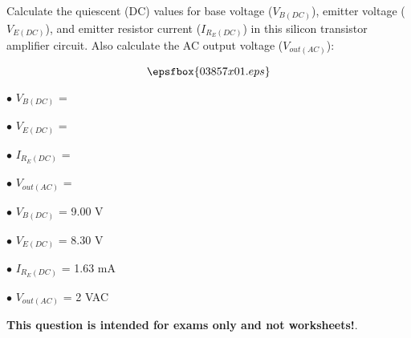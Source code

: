 

Calculate the quiescent (DC) values for base voltage ($V_{B(DC)}$), emitter voltage ($V_{E(DC)}$), and emitter resistor current ($I_{R_E(DC)}$) in this silicon transistor amplifier circuit.  Also calculate the AC output voltage ($V_{out(AC)}$):

$$\epsfbox{03857x01.eps}$$

\medskip
\item{$\bullet$} $V_{B(DC)}$ = 
\item{$\bullet$} $V_{E(DC)}$ = 
\item{$\bullet$} $I_{R_E(DC)}$ = 
\item{$\bullet$} $V_{out(AC)}$ = 
\medskip







\medskip
\goodbreak
\item{$\bullet$} $V_{B(DC)}$ = 9.00 V
\item{$\bullet$} $V_{E(DC)}$ = 8.30 V
\item{$\bullet$} $I_{R_E(DC)}$ = 1.63 mA
\item{$\bullet$} $V_{out(AC)}$ = 2 VAC
\medskip







{\bf This question is intended for exams only and not worksheets!}.



